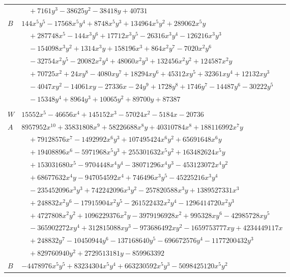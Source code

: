 \documentclass[11pt]{article}
\begin{document}
\begin{longtable}{@{}ll@{}}
 & $\quad +7161y^{3}-38625y^{2}-38418y+40731$\\
$B$ & $144x^{5}y^{5}-17568x^{5}y^{4}+8748x^{5}y^{3}+134964x^{5}y^{2}+289062x^{5}y$\\
 & $\quad +287748x^{5}-144x^{3}y^{6}+17712x^{3}y^{5}-26316x^{3}y^{4}-126216x^{3}y^{3}$\\
 & $\quad -154098x^{3}y^{2}+1314x^{3}y+158196x^{3}+864x^{2}y^{7}-7020x^{2}y^{6}$\\
 & $\quad -32754x^{2}y^{5}-20082x^{2}y^{4}+48060x^{2}y^{3}+132456x^{2}y^{2}+124587x^{2}y$\\
 & $\quad +70725x^{2}+24xy^{8}-4080xy^{7}+18294xy^{6}+45312xy^{5}+32361xy^{4}+12132xy^{3}$\\
 & $\quad -4047xy^{2}-14061xy-27336x-24y^{9}+1728y^{8}+1746y^{7}-14487y^{6}-30222y^{5}$\\
 & $\quad -15348y^{4}+8964y^{3}+10065y^{2}+89700y+87387$\\
\addlinespace[3pt]
\multicolumn{2}{@{}l}{$i=25$, $m=5184$, neighbours $30,37,64,85,90,104,108$}\\
$W$ & $15552x^{5}-46656x^{4}+145152x^{3}-57024x^{2}-5184x-20736$\\
$A$ & $8957952x^{10}+35831808x^{9}+58226688x^{8}y+40310784x^{8}+188116992x^{7}y$\\
 & $\quad +79128576x^{7}-1492992x^{6}y^{3}+107495424x^{6}y^{2}+65691648x^{6}y$\\
 & $\quad +19408896x^{6}-5971968x^{5}y^{3}+255301632x^{5}y^{2}+163482624x^{5}y$\\
 & $\quad +153031680x^{5}-9704448x^{4}y^{4}-38071296x^{4}y^{3}-453123072x^{4}y^{2}$\\
 & $\quad +68677632x^{4}y-947054592x^{4}+746496x^{3}y^{5}-45225216x^{3}y^{4}$\\
 & $\quad -235452096x^{3}y^{3}+742242096x^{3}y^{2}-257820588x^{3}y+1389527331x^{3}$\\
 & $\quad +248832x^{2}y^{6}-17915904x^{2}y^{5}-261522432x^{2}y^{4}-1296414720x^{2}y^{3}$\\
 & $\quad +4727808x^{2}y^{2}+1096229376x^{2}y-3979196928x^{2}+995328xy^{6}-42985728xy^{5}$\\
 & $\quad -365902272xy^{4}+312815088xy^{3}-973686492xy^{2}-1659753777xy+4234449117x$\\
 & $\quad +248832y^{7}-10450944y^{6}-137168640y^{5}-696672576y^{4}-1177200432y^{3}$\\
 & $\quad +829760940y^{2}+2729513181y-859963392$\\
$B$ & $-4478976x^{5}y^{5}+83234304x^{5}y^{4}+663230592x^{5}y^{3}-5098425120x^{5}y^{2}$\\

\end{longtable}
\end{document}
